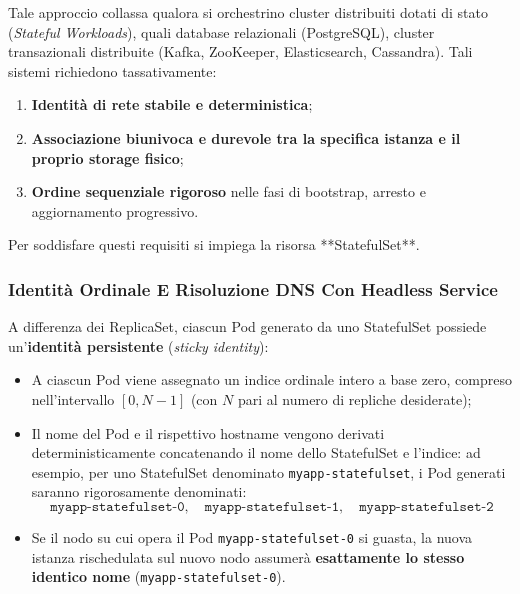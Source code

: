 \documentclass[11pt, a4paper]{article}
\begin{document}
Tale approccio collassa qualora si orchestrino cluster distribuiti dotati di stato (\emph{Stateful Workloads}), quali database relazionali (PostgreSQL), cluster transazionali distribuite (Kafka, ZooKeeper, Elasticsearch, Cassandra). Tali sistemi richiedono tassativamente:
\begin{enumerate}[noitemsep]
    \item \textbf{Identità di rete stabile e deterministica};
    \item \textbf{Associazione biunivoca e durevole tra la specifica istanza e il proprio storage fisico};
    \item \textbf{Ordine sequenziale rigoroso} nelle fasi di bootstrap, arresto e aggiornamento progressivo.
\end{enumerate}

Per soddisfare questi requisiti si impiega la risorsa **StatefulSet**.


\subsubsection{Identità Ordinale E Risoluzione DNS Con Headless Service}
A differenza dei ReplicaSet, ciascun Pod generato da uno StatefulSet possiede un'\textbf{identità persistente} (\emph{sticky identity}):
\begin{itemize}[noitemsep]
    \item A ciascun Pod viene assegnato un indice ordinale intero a base zero, compreso nell'intervallo $[0, N-1]$ (con $N$ pari al numero di repliche desiderate);
    \item Il nome del Pod e il rispettivo hostname vengono derivati deterministicamente concatenando il nome dello StatefulSet e l'indice: ad esempio, per uno StatefulSet denominato \texttt{myapp-statefulset}, i Pod generati saranno rigorosamente denominati:
    \[
    \texttt{myapp-statefulset-0}, \quad \texttt{myapp-statefulset-1}, \quad \texttt{myapp-statefulset-2}
    \]
    \item Se il nodo su cui opera il Pod \texttt{myapp-statefulset-0} si guasta, la nuova istanza rischedulata sul nuovo nodo assumerà \textbf{esattamente lo stesso identico nome} (\texttt{myapp-statefulset-0}).
\end{itemize}
\end{document}

